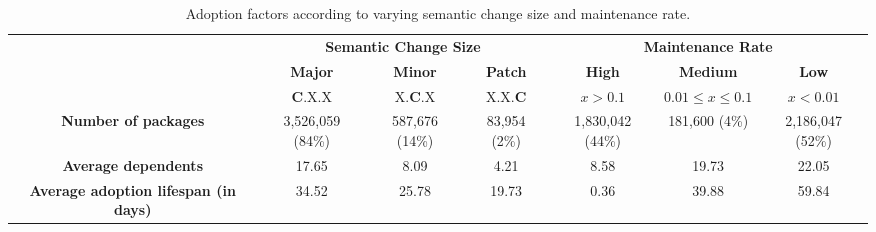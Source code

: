 \documentclass[conference]{IEEEtran}
\begin{document}
\begin{table}[ht]
\caption{Adoption factors according to varying semantic change size and maintenance rate.}
\centering
\begin{tabular}{|c|ccc|ccc|}
\hline
\multirow{2}{*}{} & \multicolumn{3}{c|}{\textbf{Semantic Change Size}} & \multicolumn{3}{c|}{\textbf{Maintenance Rate}} \\ \cline{2-7} 
                                            & \textbf{Major}     & \textbf{Minor}    & \textbf{Patch}   & \textbf{High}      & \textbf{Medium}    & \textbf{Low}      \\ 
                                            & \textbf{C}.X.X    & X.\textbf{C}.X      & X.X.\textbf{C}   & $x > 0.1$      & $0.01 \le x \le 0.1$      & $x < 0.01$      \\ \hline
\textbf{Number of packages}                 & 3,526,059 (84\%)           & 587,676 (14\%)          & 83,954 (2\%)          & 1,830,042 (44\%)    & 181,600 (4\%)      & 2,186,047 (52\%)   \\ \hline
\textbf{Average dependents}                 & 17.65              & 8.09              & 4.21             & 8.58               & 19.73              & 22.05              \\ \hline
\textbf{Average adoption lifespan (in days)} & 34.52             & 25.78             & 19.73            & 0.36               & 39.88              & 59.84               \\ \hline
\end{tabular}

\label{table:semantic_maintenance}
\end{table}
\end{document}
